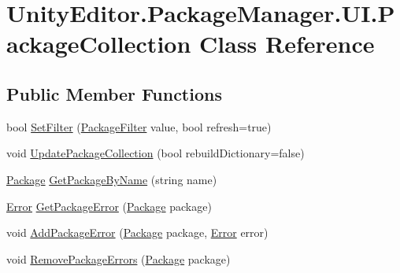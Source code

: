 \hypertarget{class_unity_editor_1_1_package_manager_1_1_u_i_1_1_package_collection}{}\section{Unity\+Editor.\+Package\+Manager.\+U\+I.\+Package\+Collection Class Reference}
\label{class_unity_editor_1_1_package_manager_1_1_u_i_1_1_package_collection}
\subsection*{Public Member Functions}
\begin{DoxyCompactItemize}
\item 
bool \mbox{\hyperlink{class_unity_editor_1_1_package_manager_1_1_u_i_1_1_package_collection_a376f256e424d8ac231a101e35d83799b}{Set\+Filter}} (\mbox{\hyperlink{namespace_unity_editor_1_1_package_manager_1_1_u_i_aec89f744729646d8e261787be78942c8}{Package\+Filter}} value, bool refresh=true)
\item 
void \mbox{\hyperlink{class_unity_editor_1_1_package_manager_1_1_u_i_1_1_package_collection_a96dc5d2b0f975f54efa2a57a93d0cbdb}{Update\+Package\+Collection}} (bool rebuild\+Dictionary=false)
\item 
\mbox{\hyperlink{class_unity_editor_1_1_package_manager_1_1_u_i_1_1_package}{Package}} \mbox{\hyperlink{class_unity_editor_1_1_package_manager_1_1_u_i_1_1_package_collection_a14d75c5f573cc182d33fe76cd4f3d7e8}{Get\+Package\+By\+Name}} (string name)
\item 
\mbox{\hyperlink{namespace_unity_editor_1_1_package_manager_1_1_u_i_ab1815eb3e48074893d9dc1dc99a4a32aa902b0d55fddef6f8d651fe1035b7d4bd}{Error}} \mbox{\hyperlink{class_unity_editor_1_1_package_manager_1_1_u_i_1_1_package_collection_a05751206796fd79618b248930a0711ea}{Get\+Package\+Error}} (\mbox{\hyperlink{class_unity_editor_1_1_package_manager_1_1_u_i_1_1_package}{Package}} package)
\item 
void \mbox{\hyperlink{class_unity_editor_1_1_package_manager_1_1_u_i_1_1_package_collection_a8bd5c0f86d4add56e3e7b578ed70e4a5}{Add\+Package\+Error}} (\mbox{\hyperlink{class_unity_editor_1_1_package_manager_1_1_u_i_1_1_package}{Package}} package, \mbox{\hyperlink{namespace_unity_editor_1_1_package_manager_1_1_u_i_ab1815eb3e48074893d9dc1dc99a4a32aa902b0d55fddef6f8d651fe1035b7d4bd}{Error}} error)
\item 
void \mbox{\hyperlink{class_unity_editor_1_1_package_manager_1_1_u_i_1_1_package_collection_a675bfec6785ec51c5f8c2d1d2aab3ff0}{Remove\+Package\+Errors}} (\mbox{\hyperlink{class_unity_editor_1_1_package_manager_1_1_u_i_1_1_package}{Package}} package)
\end{DoxyCompactItemize}

